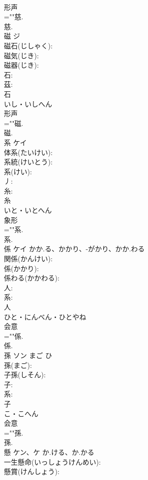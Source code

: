 \documentclass[8pt]{extreport}
\begin{document}
\begin{CJK}{UTF8}{min}
\\	形声 
\\	=""慈.
\\	慈.
\\	磁	ジ			
\\	磁石(じしゃく): 
\\	磁気(じき): 
\\	磁器(じき): 
\\	石: 
\\	茲: 
\\	石	
\\	いし・いしへん	
\\	形声 
\\	=""磁.
\\	磁.
\\	系	ケイ			
\\	体系(たいけい): 
\\	系統(けいとう): 
\\	系(けい): 
\\	丿: 
\\	糸: 
\\	糸	
\\	いと・いとへん	
\\	象形 
\\	=""系.
\\	系.
\\	係	ケイ	かか.る、かかり、-がかり、かか.わる		
\\	関係(かんけい): 
\\	係(かかり): 
\\	係わる(かかわる): 
\\	人: 
\\	系: 
\\	人	
\\	ひと・にんべん・ひとやね	
\\	会意 
\\	=""係.
\\	係.
\\	孫	ソン	まご	ひ	
\\	孫(まご): 
\\	子孫(しそん): 
\\	子: 
\\	系: 
\\	子	
\\	こ・こへん	
\\	会意 
\\	=""孫.
\\	孫.
\\	懸	ケン、ケ	か.ける、か.かる		
\\	一生懸命(いっしょうけんめい): 
\\	懸賞(けんしょう): 

\end{CJK}
\end{document}

